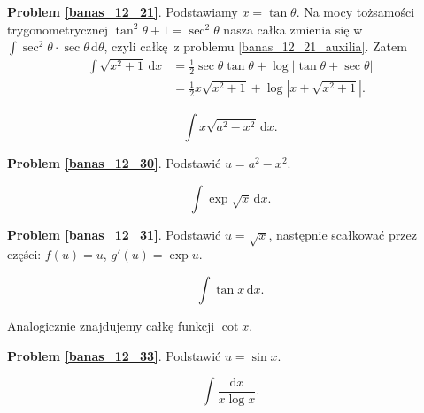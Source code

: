 \textbf{Problem \ref{banas_12_21}}.
Podstawiamy $x = \tan \theta$.
Na mocy tożsamości trygonometrycznej $\tan^2 \theta + 1 = \sec^2 \theta$ nasza całka zmienia się w $\int \sec^2 \theta \cdot \sec \theta \,\mathrm{d}\theta$, czyli całkę z problemu \ref{banas_12_21_auxilia}.
Zatem
\begin{align}
    \int \sqrt{x^2 + 1} \, \mathrm{d}x & = \frac 12 \sec \theta \tan \theta + \log |\tan \theta + \sec \theta| \\
    & = \frac 1 2 x \sqrt{x^2 + 1} + \log \left|x + \sqrt{x^2+1}\right|.
\end{align}

\begin{problem_with_solution}
    \label{banas_12_30}%
    \begin{equation}
        \int x \sqrt{a^2 - x^2} \, \mathrm{d}x.
    \end{equation}
\end{problem_with_solution}

\textbf{Problem \ref{banas_12_30}}.
Podstawić $u = a^2 - x^2$.

\begin{problem_with_solution}
    \label{banas_12_31}%
    \begin{equation}
        \int \exp \sqrt x \, \mathrm{d}x.
    \end{equation}
\end{problem_with_solution}

\textbf{Problem \ref{banas_12_31}}.
Podstawić $u = \sqrt x$, następnie scałkować przez części: $f(u) = u$, $g'(u) = \exp u$.

\begin{problem_with_solution}
    \label{banas_12_33}%
    \begin{equation}
        \int \tan x \, \mathrm{d}x.
    \end{equation}
\end{problem_with_solution}

Analogicznie znajdujemy całkę funkcji $\cot x$.

\textbf{Problem \ref{banas_12_33}}.
Podstawić $u = \sin x$.

\begin{problem_with_solution}
    \label{banas_12_34}%
    \begin{equation}
        \int \frac{\mathrm{d}x}{x \log x}.
    \end{equation}
\end{problem_with_solution}

